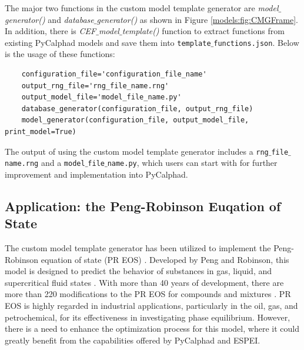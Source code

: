 The major two functions in the custom model template generator are \textit{model$\_$generator()} and \textit{database$\_$generator()} as shown in Figure \ref{models:fig:CMGFrame}. In addition, there is \textit{CEF$\_$model$\_$template()} function to extract functions from existing PyCalphad models and save them into \texttt{template$\_$functions.json}. Below is the usage of these functions:
\begin{verbatim}
    configuration_file='configuration_file_name'
    output_rng_file='rng_file_name.rng'
    output_model_file='model_file_name.py'
    database_generator(configuration_file, output_rng_file)
    model_generator(configuration_file, output_model_file, print_model=True)
\end{verbatim}
The output of using the custom model template generator includes a \texttt{rng$\_$file$\_$name.rng} and a \texttt{model$\_$file$\_$name.py}, which users can start with for further improvement and implementation into PyCalphad.

\subsection{Application: the Peng-Robinson Euqation of State} \label{models:ssec:CMTGapp} %
The custom model template generator has been utilized to implement the Peng-Robinson equation of state (PR EOS) \cite{peng1976new}. Developed by Peng and Robinson, this model is designed to predict the behavior of substances in gas, liquid, and supercritical fluid states \cite{peng1976new}. With more than 40 years of development, there are more than 220 modifications to the PR EOS for compounds and mixtures \cite{LopezEcheverry201739}. PR EOS is highly regarded in industrial applications, particularly in the oil, gas, and petrochemical, for its effectiveness in investigating phase equilibrium. However, there is a need to enhance the optimization process for this model, where it could greatly benefit from the capabilities offered by PyCalphad and ESPEI.

